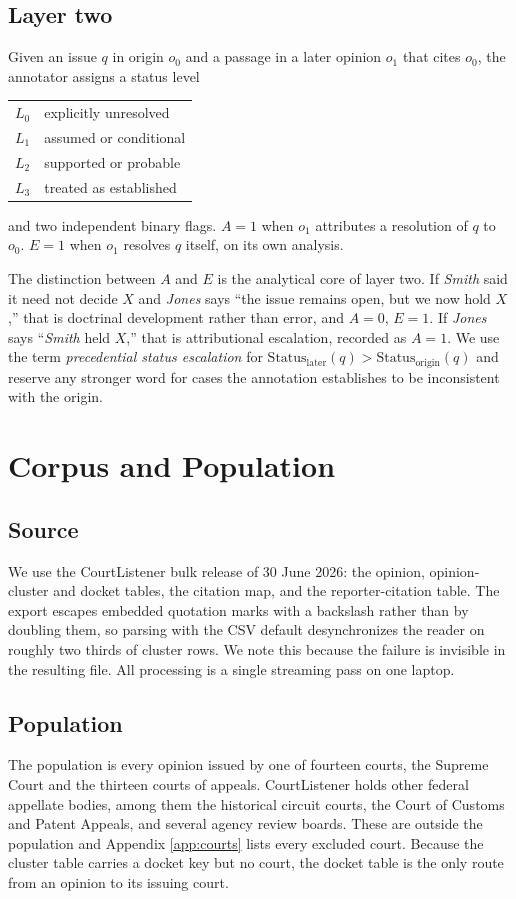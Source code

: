 \documentclass[11pt]{article}
\begin{document}
\subsection{Layer two} Given an issue $q$ in origin $o_0$ and a passage in a
later opinion $o_1$ that cites $o_0$, the annotator assigns a status level
\begin{center}
\begin{tabular}{ll}
$L_0$ & explicitly unresolved \\
$L_1$ & assumed or conditional \\
$L_2$ & supported or probable \\
$L_3$ & treated as established \\
\end{tabular}
\end{center}
and two independent binary flags. $A=1$ when $o_1$ attributes a resolution of $q$
to $o_0$. $E=1$ when $o_1$ resolves $q$ itself, on its own analysis.

The distinction between $A$ and $E$ is the analytical core of layer two. If
\emph{Smith} said it need not decide $X$ and \emph{Jones} says ``the issue
remains open, but we now hold $X$,'' that is doctrinal development rather than error, and
$A=0$, $E=1$. If \emph{Jones} says ``\emph{Smith} held $X$,'' that is
attributional escalation, recorded as $A=1$. We use the term \emph{precedential status
escalation} for $\mathrm{Status}_{\text{later}}(q) > \mathrm{Status}_{\text{origin}}(q)$
and reserve any stronger word for cases the annotation establishes to be
inconsistent with the origin.

\section{Corpus and Population}
\label{sec:corpus}

\subsection{Source} We use the CourtListener bulk release of 30 June 2026: the
opinion, opinion-cluster and docket tables, the citation map, and the
reporter-citation table. The export escapes embedded quotation marks with a
backslash rather than by doubling them, so parsing with the CSV default
desynchronizes the reader on roughly two thirds of cluster rows. We note this
because the failure is invisible in the resulting file. All processing is a
single streaming pass on one laptop.

\subsection{Population} The population is every opinion issued by one of fourteen
courts, the Supreme Court and the thirteen courts of appeals. CourtListener holds
other federal appellate bodies, among them the historical circuit courts, the
Court of Customs and Patent Appeals, and several agency review boards. These are
outside the population and Appendix \ref{app:courts} lists every excluded court.
Because the cluster table carries a docket key but no court, the docket table is
the only route from an opinion to its issuing court.
\end{document}
